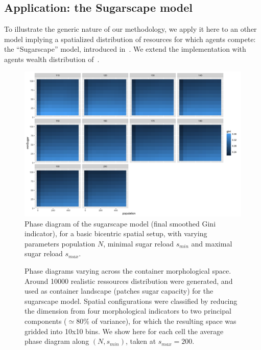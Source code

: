 \documentclass[a4paper,12pt]{article}
\begin{document}
\subsection{Application: the Sugarscape model}

To illustrate the generic nature of our methodology, we apply it here to an other model implying a spatialized distribution of resources for which agents compete: the ``Sugarscape'' model, introduced in~\cite{epstein1996growing}. We extend the implementation with agents wealth distribution of~\cite{li2009netlogo}.


\begin{figure}
\centering
\includegraphics[width=\textwidth]{figures/fixed_phase_diagram}
\caption{Phase diagram of the sugarscape model (final smoothed Gini indicator), for a basic bicentric spatial setup, with varying parameters population $N$, minimal sugar reload $s_{min}$ and maximal sugar reload $s_{max}$.}
\label{fig:sugarscape-phasediagram}
\end{figure}


\begin{figure}
\centering
\caption{Phase diagrams varying across the container morphological space. Around 10000 realistic ressources distribution were generated, and used as container landscape (patches sugar capacity) for the sugarscape model. Spatial configurations were classified by reducing the dimension from four morphological indicators to two principal components ($\simeq$80\% of variance), for which the resulting space was gridded into 10x10 bins. We show here for each cell the average phase diagram along $(N,s_{min})$, taken at $s_{max}=200$.}
\label{fig:sugarscape-meta}
\end{figure}
\end{document}
